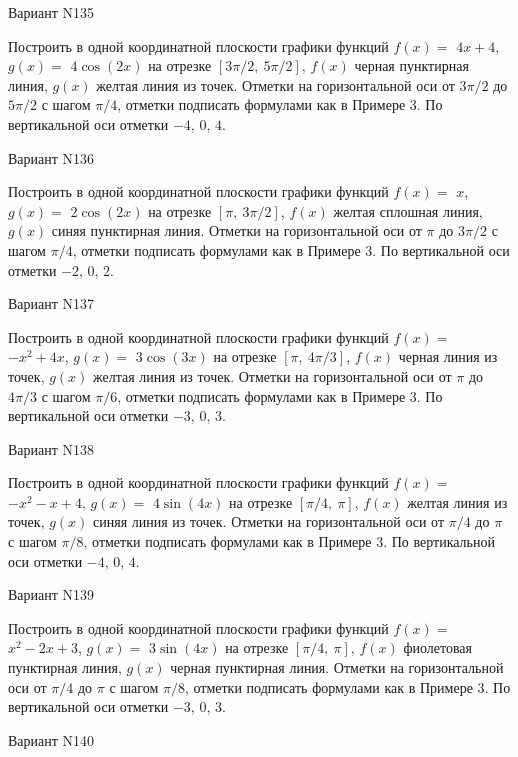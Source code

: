 \documentclass[11pt]{report}
\begin{document}
Вариант N135

Построить в одной координатной плоскости графики функций $f(x) = $
    $4 x + 4$, $g(x) = $
    $4 \cos{\left(2 x \right)}$ на 
    отрезке $\left[ 3 \pi / 2, \  5 \pi / 2\right]$, $f(x)$ черная 
    пунктирная линия, $g(x)$ желтая линия из точек. 
    Отметки на горизонтальной оси от $3 \pi / 2$ до $5 \pi / 2$ с 
    шагом $\pi / 4$, отметки подписать формулами как в Примере 3.  
    По вертикальной оси отметки $-4$, 0, $4$.

Вариант N136

Построить в одной координатной плоскости графики функций $f(x) = $
    $x$, $g(x) = $
    $2 \cos{\left(2 x \right)}$ на 
    отрезке $\left[ \pi, \  3 \pi / 2\right]$, $f(x)$ желтая 
    сплошная линия, $g(x)$ синяя пунктирная линия. 
    Отметки на горизонтальной оси от $\pi$ до $3 \pi / 2$ с 
    шагом $\pi / 4$, отметки подписать формулами как в Примере 3.  
    По вертикальной оси отметки $-2$, 0, $2$.

Вариант N137

Построить в одной координатной плоскости графики функций $f(x) = $
    $- x^{2} + 4 x$, $g(x) = $
    $3 \cos{\left(3 x \right)}$ на 
    отрезке $\left[ \pi, \  4 \pi / 3\right]$, $f(x)$ черная 
    линия из точек, $g(x)$ желтая линия из точек. 
    Отметки на горизонтальной оси от $\pi$ до $4 \pi / 3$ с 
    шагом $\pi / 6$, отметки подписать формулами как в Примере 3.  
    По вертикальной оси отметки $-3$, 0, $3$.

Вариант N138

Построить в одной координатной плоскости графики функций $f(x) = $
    $- x^{2} - x + 4$, $g(x) = $
    $4 \sin{\left(4 x \right)}$ на 
    отрезке $\left[ \pi / 4, \  \pi\right]$, $f(x)$ желтая 
    линия из точек, $g(x)$ синяя линия из точек. 
    Отметки на горизонтальной оси от $\pi / 4$ до $\pi$ с 
    шагом $\pi / 8$, отметки подписать формулами как в Примере 3.  
    По вертикальной оси отметки $-4$, 0, $4$.

Вариант N139

Построить в одной координатной плоскости графики функций $f(x) = $
    $x^{2} - 2 x + 3$, $g(x) = $
    $3 \sin{\left(4 x \right)}$ на 
    отрезке $\left[ \pi / 4, \  \pi\right]$, $f(x)$ фиолетовая 
    пунктирная линия, $g(x)$ черная пунктирная линия. 
    Отметки на горизонтальной оси от $\pi / 4$ до $\pi$ с 
    шагом $\pi / 8$, отметки подписать формулами как в Примере 3.  
    По вертикальной оси отметки $-3$, 0, $3$.

Вариант N140
\end{document}
